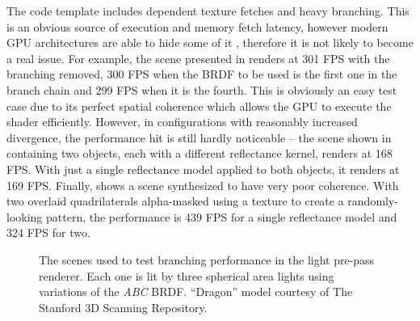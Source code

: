 The code template includes dependent texture fetches and heavy branching. This is an obvious source of execution and memory fetch latency, however modern GPU architectures are able to hide some of it \cite{overviewOfGPUArch}, therefore it is not likely to become a real issue. For example, the scene presented in  renders at 301 FPS with the branching removed, 300 FPS when the BRDF to be used is the first one in the branch chain and 299 FPS when it is the fourth. This is obviously an easy test case due to its perfect spatial coherence which allows the GPU to execute the shader efficiently. However, in configurations with reasonably increased divergence, the performance hit is still hardly noticeable -- the scene shown in  containing two objects, each with a different reflectance kernel, renders at 168 FPS. With just a single reflectance model applied to both objects, it renders at 169 FPS. Finally,  shows a scene synthesized to have very poor coherence. With two overlaid quadrilaterals alpha-masked using a texture to create a randomly-looking pattern, the performance is 439 FPS for a single reflectance model and 324 FPS for two.

\begin{figure}[ht!]
  \centering
  \caption[Test scenes for branching performance]{The scenes used to test branching performance in the light pre-pass renderer. Each one is lit by three spherical area lights using variations of the \emph{ABC} BRDF. ``Dragon'' model courtesy of The Stanford 3D Scanning Repository.}
\label{fig:lppBranching}
\end{figure}

